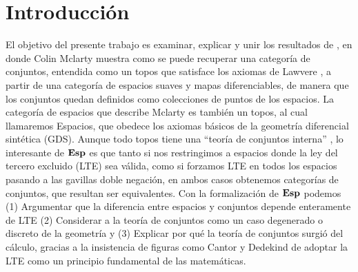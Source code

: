 \chapter*{Introducción}
\label{intro}









El objetivo del presente trabajo es examinar, explicar y unir los resultados de \cite{mclarty1987elementary}, \cite{mclarty1988defining}
en donde Colin Mclarty muestra como se puede recuperar una categoría de conjuntos, entendida
como un topos que satisface los axiomas de Lawvere \cite{lawvere1964elementary}, a partir de una categoría de
espacios suaves y mapas diferenciables, de manera que los conjuntos quedan definidos como colecciones de puntos de los
espacios. La categoría de espacios que describe Mclarty es también un topos, al cual
llamaremos Espacios, que obedece los axiomas básicos de la geometría diferencial sintética
(GDS). Aunque todo topos tiene una ``teoría de conjuntos interna'' \cite{johnstone2014topos}, lo interesante de $\mathbf{Esp}$
es que tanto si nos restringimos a espacios donde la ley del tercero excluido (LTE) sea válida,
como si forzamos LTE en todos los espacios pasando a las gavillas doble negación, en ambos
casos obtenemos categorías de conjuntos, que resultan ser equivalentes. Con la formalización
de $\mathbf{Esp}$ podemos (1) Argumentar que la diferencia entre espacios y conjuntos depende
enteramente de LTE (2) Considerar a la teoría de conjuntos como un caso degenerado o
discreto de la geometría y (3) Explicar por qué la teoría de conjuntos surgió del cálculo,
gracias a la insistencia de figuras como Cantor y Dedekind de adoptar la LTE como un
principio fundamental de las matemáticas.


